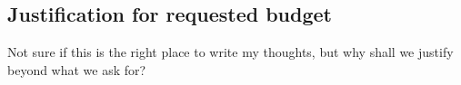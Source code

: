 \documentclass[a4paper,12pt]{report}
\begin{document}
\newpage

\subsection*{Justification for requested budget }

Not sure if this is the right place to write my thoughts, but why shall we justify beyond what we ask for? 



\end{document}
